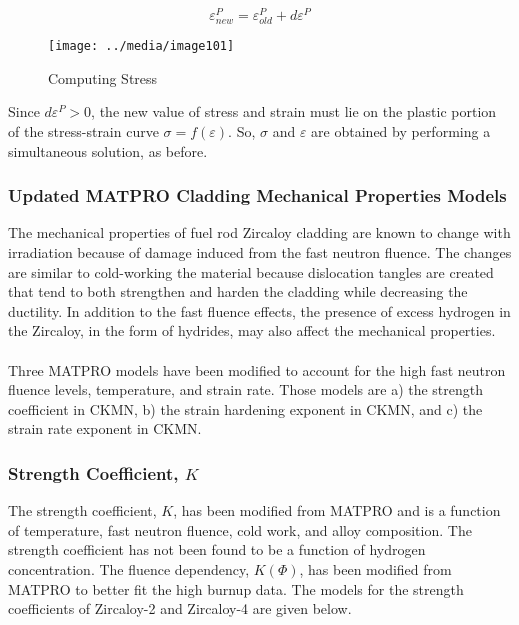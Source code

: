 \begin{equation} 
    \varepsilon^{P}_{new} = \varepsilon^{P}_{old} + d\varepsilon^{P} 
\end{equation} 

\begin{figure}
    \texttt{[image: ../media/image101]}
    \caption{Computing Stress}
    \label{fig:computing_stress}
\end{figure}

Since $d\varepsilon^{P} > 0$, the new value of stress and strain must lie on the plastic portion of
the stress-strain curve $\sigma = f(\varepsilon) $. So, $\sigma$ and $\varepsilon$ are obtained by
performing a simultaneous solution, as before.

\subsubsection{Updated MATPRO Cladding Mechanical Properties Models}\label{section:updated-matpro-cladding-mechanical-properties-models}

The mechanical properties of fuel rod Zircaloy cladding are known to change with irradiation because
of damage induced from the fast neutron fluence. The changes are similar to cold-working the
material because dislocation tangles are created that tend to both strengthen and harden the
cladding while decreasing the ductility. In addition to the fast fluence effects, the presence of
excess hydrogen in the Zircaloy, in the form of hydrides, may also affect the mechanical properties.
\\
\\
Three MATPRO models have been modified to account for the high fast
neutron fluence levels, temperature, and strain rate. Those models are
a) the strength coefficient in CKMN, b) the strain hardening exponent in
CKMN, and c) the strain rate exponent in CKMN.

\subsubsection{Strength Coefficient, $K$}\label{section:strength-coefficient-k}

The strength coefficient, $K$, has been modified from MATPRO and is a function of temperature,
fast neutron fluence, cold work, and alloy composition. The strength coefficient has not been found
to be a function of hydrogen concentration. The fluence dependency, $K(\Phi)$, has been modified
from MATPRO to better fit the high burnup data. The models for the strength coefficients of
Zircaloy-2 and Zircaloy-4 are given below.

